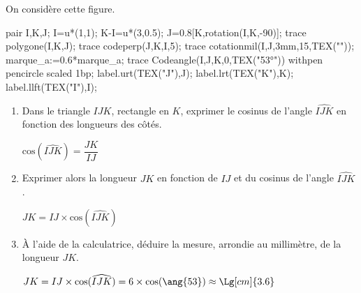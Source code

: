     On considère cette figure.

    \begin{Geometrie}
        pair I,K,J;
        I=u*(1,1);
        K-I=u*(3,0.5);
        J=0.8[K,rotation(I,K,-90)];
        trace polygone(I,K,J);
        trace codeperp(J,K,I,5);
        trace cotationmil(I,J,3mm,15,TEX(""));
        marque_a:=0.6*marque_a;
        trace Codeangle(I,J,K,0,TEX("\ang{53}")) withpen pencircle scaled 1bp;
        label.urt(TEX("J"),J);
        label.lrt(TEX("K"),K);
        label.llft(TEX("I"),I);
    \end{Geometrie}

    \begin{enumerate}
        \item Dans le triangle $IJK$, rectangle en $K$, exprimer le cosinus de l'angle $\widehat{IJK}$ en fonction des longueurs des côtés.

        {\color{red} $\text{cos}(\widehat{IJK})=\dfrac{JK}{IJ}$}
        \item Exprimer alors la longueur $JK$ en fonction de $IJ$ et du cosinus de l'angle $\widehat{IJK}$.

        {\color{red} $JK=IJ\times \text{cos}(\widehat{IJK})$}
        \item À l'aide de la calculatrice, déduire la mesure, arrondie au millimètre, de la longueur $JK$.

        {\color{red} $JK=IJ\times \text{cos}(\widehat{IJK})=6\times \text{cos}(\ang{53})\approx\Lg[cm]{3.6}$}
    \end{enumerate}
